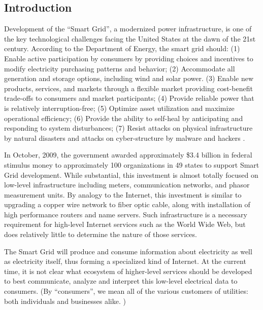 
\subsection{Introduction}

Development of the ``Smart Grid'', a modernized power infrastructure, is
one of the key technological challenges facing the United States at the
dawn of the 21st century. According to the Department of Energy, the smart
grid should: (1) Enable active participation by consumers by providing
choices and incentives to modify electricity purchasing patterns and
behavior; (2) Accommodate all generation and storage options, including
wind and solar power.  (3) Enable new products, services, and markets
through a flexible market providing cost-benefit trade-offs to consumers and
market participants; (4) Provide reliable power that is relatively
interruption-free; (5) Optimize asset utilization and maximize operational
efficiency; (6) Provide the ability to self-heal by anticipating and
responding to system disturbances; (7) Resist attacks on physical
infrastructure by natural disasters and attacks on cyber-structure by
malware and hackers \cite{NETL:GridCharacteristics}.

In October, 2009, the government awarded approximately \$3.4 billion in
federal stimulus money to approximately 100 organizations in 49 states to
support Smart Grid development.  While substantial, this investment is
almost totally focused on low-level infrastructure including meters,
communication networks, and phasor measurement units.  By analogy to the
Internet, this investment is similar to upgrading a copper wire network to
fiber optic cable, along with installation of high performance routers and
name servers.  Such infrastructure is a necessary requirement for
high-level Internet services such as the World Wide Web, but does
relatively little to determine the nature of those services.

The Smart Grid will produce and consume information about electricity as
well as electricity itself, thus forming a specialized kind of Internet. At
the current time, it is not clear what ecosystem of higher-level services
should be developed to best communicate, analyze and interpret this
low-level electrical data to consumers.  (By ``consumers'', we mean all of
the various customers of utilities: both individuals and businesses
alike. )

